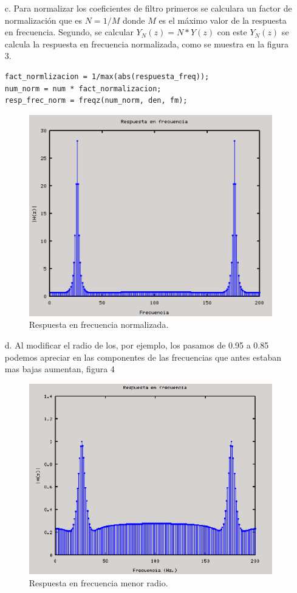 \documentclass[10pt,a4paper,final]{article}
\begin{document}
\begin{itemize}
\item[c.] Para normalizar los coeficientes de filtro primeros se calculara un factor de normalización que es $N=1/M$ donde $M$ es el máximo valor de la respuesta en frecuencia. Segundo, se calcular $Y_N(z)=N*Y(z)$ con este $Y_N(z)$ se calcula la respuesta en frecuencia normalizada, como se muestra en la figura 3.


\begin{lstlisting}
fact_normlizacion = 1/max(abs(respuesta_freq));
num_norm = num * fact_normalizacion;
resp_frec_norm = freqz(num_norm, den, fm);
\end{lstlisting}
\begin{figure}[h!]
\centering
  \caption{Respuesta en frecuencia normalizada.}
  \label{fig:respN}
  \includegraphics[scale=0.6]{fig3.png}
    
\end{figure}


\item[d.] Al modificar el radio de los, por ejemplo, los pasamos de 0.95 a 0.85 podemos apreciar en las componentes de las frecuencias que antes estaban mas bajas aumentan, figura 4

\begin{figure}[h!]
	\centering
	\caption{Respuesta en frecuencia menor radio.}
  \label{fig:respMenor}
  \includegraphics[scale=0.7]{fig4.png}
    

\end{figure}
\end{itemize}
\end{document}
